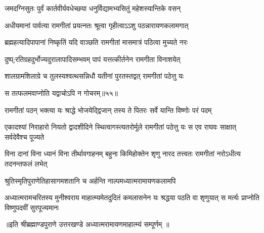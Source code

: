 \twolineshloka
{जमदग्निसुतः पुर्वं कार्तवीर्यवधेच्छया}
{धनुर्विद्यामभ्यसितुं महेशस्यान्तिके वसन्} %

\twolineshloka
{अधीयमानां पार्वत्या रामगीतां प्रयत्नतः}
{श्रूत्वा गृहीत्वाऽऽशु पठन्नारायणकलामगात्} %

\twolineshloka
{ब्रह्महत्यादिपापानां निष्कृतिं यदि वाञ्छति}
{रामगीतां मासमात्रं पठित्वा मुच्यते नरः} %

\twolineshloka
{दुष्प्;रतिग्रहदुर्भोज्यदुरालापादिसम्भवम्}
{पापं यत्तत्कीर्तनेन रामगीता विनाशयेत्} %

\twolineshloka
{शालग्रामशिलाग्रे च तुलस्यश्वत्थसन्निधौ}
{यतीनां पुरतस्तद्वत् रामगीतां पठेत्तु यः} %

{स तत्फलमवाप्नोति यद्वाचोऽपि न गोचरम्॥५५॥} %


\twolineshloka
{रामगीतां पठन् भक्त्या यः श्राद्धे भोजयेद्द्विजान्}
{तस्य ते पितरः सर्वे यान्ति विष्णोः परं पदम्} %

\threelineshloka
{एकादश्यां निराहारो नियतो द्वादशीदिने}
{स्थित्वागस्त्यतरोर्मूले रामगीतां पठेत्तु यः}
{स एव राघवः साक्षात् सर्वदेवैश्च पूज्यते} %

\threelineshloka
{विना दानां विना ध्यानं विना तीर्थावगाहनम्}
{बहुना किमिहोक्तेन शृणु नारद तत्त्वतः}
{रामगीतां नरोऽधीत्य तदनन्तफलं लभेत्} %

\twolineshloka
{श्रुतिस्मृतिपुराणेतिहासागमशतानि च}
{अर्हन्ति नाल्पमध्यात्मरामायणकलामपि} %

\fourlineindentedshloka
{अध्यात्मरामचरितस्य मुनीश्वराय}
{माहात्म्यमेतदुदितं कमलासनेन}
{यः श्रद्धया पठति वा शृणुयात् स मर्त्यः}
{प्राप्नोति विष्णुपदवीं सुरपूज्यमानः} %

{॥इति श्रीब्रह्माण्डपुराणे उत्तरखण्डे अध्यात्मरामायणमाहात्म्यं सम्पूर्णम् ॥
}


